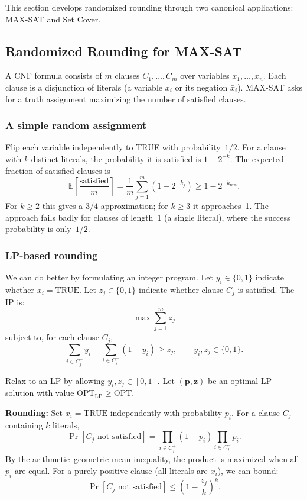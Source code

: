 \documentclass[twoside,12pt]{book}
\theoremstyle{plain}
\theoremstyle{definition}
\theoremstyle{remark}
\begin{document}
This section develops randomized rounding through two canonical
applications: MAX-SAT and Set Cover.

\subsection{Randomized Rounding for MAX-SAT}

A CNF formula consists of $m$ clauses $C_1,\ldots,C_m$ over variables
$x_1,\ldots,x_n$. Each clause is a disjunction of literals (a variable
$x_i$ or its negation $\bar{x}_i$). MAX-SAT asks for a truth assignment
maximizing the number of satisfied clauses.

\subsubsection*{A simple random assignment}

Flip each variable independently to TRUE with probability~$1/2$.
For a clause with $k$ distinct literals, the probability it is
satisfied is $1 - 2^{-k}$.  The expected fraction of satisfied
clauses is
\[
\mathbb{E}\!\left[\frac{\text{satisfied}}{m}\right]
= \frac{1}{m} \sum_{j=1}^m (1 - 2^{-k_j})
\ge 1 - 2^{-k_{\min}}.
\]
For $k \ge 2$ this gives a $3/4$-approximation; for $k \ge 3$ it
approaches~1.  The approach fails badly for clauses of length~1 (a
single literal), where the success probability is only~$1/2$.

\subsubsection*{LP-based rounding}

We can do better by formulating an integer program.  Let $y_i \in \{0,1\}$
indicate whether $x_i = \text{TRUE}$.  Let $z_j \in \{0,1\}$ indicate
whether clause $C_j$ is satisfied.  The IP is:
\[
\max \sum_{j=1}^m z_j
\]
subject to, for each clause $C_j$,
\[
\sum_{i \in C_j^+} y_i + \sum_{i \in C_j^-} (1 - y_i) \ge z_j,
\qquad y_i, z_j \in \{0,1\}.
\]

Relax to an LP by allowing $y_i, z_j \in [0,1]$.  Let
$(\mathbf{p}, \mathbf{z})$ be an optimal LP solution with value
$\text{OPT}_{\text{LP}} \ge \text{OPT}$.

\textbf{Rounding:} Set $x_i = \text{TRUE}$ independently with
probability $p_i$.  For a clause $C_j$ containing $k$ literals,
\[
\Pr[C_j \text{ not satisfied}] = \prod_{i \in C_j^+} (1-p_i)
                                \prod_{i \in C_j^-} p_i.
\]
By the arithmetic--geometric mean inequality, the product is
maximized when all $p_i$ are equal.  For a purely positive clause
(all literals are $x_i$), we can bound:
\[
\Pr[C_j \text{ not satisfied}] \le \left(1 - \frac{z_j}{k}\right)^k.
\]
\end{document}
